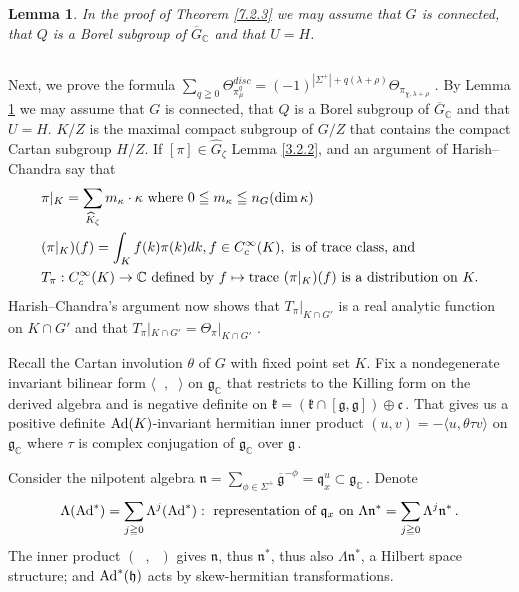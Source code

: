 \documentclass{conm-p-l}
\newtheorem{lemma}[equation]{Lemma}
\renewcommand{\gg}{\mathfrak{g}}
\newcommand{\gq}{\mathfrak{q}}
\def\gc{\mathfrak{c}}
\def\gg{\mathfrak{g}}
\def\gh{\mathfrak{h}}
\def\gk{\mathfrak{k}}
\def\gn{\mathfrak{n}}
\def\gq{\mathfrak{q}}
\def\Ad{{\rm Ad}}
\def\trace{{\rm trace\,\,}}
\def\C{\mathbb{C}}
\begin{document}
\begin{lemma}\label{7.5.4}
In the proof of {\rm Theorem \ref{7.2.3}} we may
assume that $G$ is connected, that $Q$ is a Borel subgroup of $\overline{G}_\C$
and that $U = H$.
\end{lemma}

\subsection{}\label{ssec7f}\setcounter{equation}{0}
Next, we prove the formula 
$\sum_{q \geqq 0} \Theta^{disc}_{\pi_\mu^q} =
 (-1)^{|\Sigma^+| + q(\lambda + \rho)}\Theta_{\pi_{\chi, \lambda + \rho}}$\,\,.
By Lemma \ref{7.5.4} we may assume that $G$ is connected, that
$Q$ is a Borel subgroup of $\overline{G}_\C$ and that $U = H$.
$K/Z$ is the maximal compact subgroup of $G/Z$ that contains the compact
Cartan subgroup $H/Z$.  If $[\pi] \in \widehat{G}_\zeta$ Lemma \ref{3.2.2},
and an argument \cite[\S 5]{HC1954b} of Harish--Chandra say that
\begin{equation}\label{7.6.1}
\begin{aligned}
&\pi|_K = 
	\sum_{\widehat{K}_\zeta} m_\kappa\cdot\kappa \text{ where }
	0 \leqq m_\kappa \leqq n_G (\dim\kappa) \\
&(\pi|_K)(f) = \int_K f(k)\pi(k)dk, f \in C^\infty_c(K),
	\text{ is of trace class, and} \\ 
&T_\pi : C^\infty_c(K) \to \C \text{ defined by }
	f \mapsto \trace(\pi|_K)(f) 
	\text{ is a distribution on } K.  
\end{aligned}
\end{equation}
Harish--Chandra's argument \cite[\S 12]{HC1956c} now shows that 
$T_\pi|_{K \cap G'}$
is a real analytic function on $K \cap G'$ and that 
$T_\pi|_{K \cap G'} = \Theta_\pi|_{K \cap G'}$\,\,.

Recall the Cartan involution $\theta$ of $G$ with fixed point set $K$.  Fix a
nondegenerate invariant bilinear form $\langle\phantom{x},\phantom{x}\rangle$ on
$\gg_\C$ that restricts to the Killing form on the derived algebra and is
negative definite on $\gk = (\gk \cap [\gg,\gg])\oplus \gc$\,.  That gives 
us a positive definite $\Ad(K)$-invariant hermitian inner product
$(u,v) = -\langle u, \theta\tau v\rangle$ 
on $\gg_\C$ where $\tau$ is complex conjugation of $\gg_\C$ over $\gg$\,.

Consider the nilpotent algebra $\gn = \sum_{\phi \in \Sigma^+} 
	\overline{\gg}^{-\phi} = \gq_x^u \subset \gg_\C$\,. 
Denote 
\begin{equation}\label{7.6.3}
\Lambda(\Ad^*) = \sum_{j \geqq 0} \Lambda^j(\Ad^*): 
	\text{ representation of } \gq_x \text{ on }
	\Lambda\gn^* = \sum_{j \geqq 0} \Lambda^j\gn^*\,. 
\end{equation}
The inner product $(\phantom{x},\phantom{x})$ gives $\gn$, thus $\gn^*$, 
thus also $\Lambda\gn^*$,
a Hilbert space structure; and $\Ad^*(\gh)$ acts by skew-hermitian
transformations.
\end{document}
